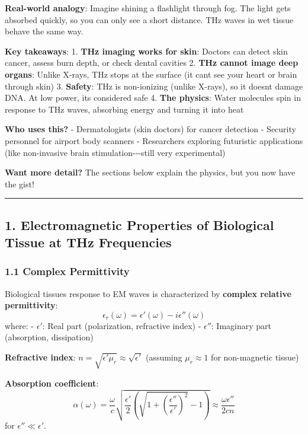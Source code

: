 \textbf{Real-world analogy}: Imagine shining a flashlight through fog.
The light gets absorbed quickly, so you can only see a short distance.
THz waves in wet tissue behave the same way.

\textbf{Key takeaways}: 1. \textbf{THz imaging works for skin}: Doctors
can detect skin cancer, assess burn depth, or check dental cavities 2.
\textbf{THz cannot image deep organs}: Unlike X-rays, THz stops at the
surface (it can\textquotesingle t see your heart or brain through skin)
3. \textbf{Safety}: THz is non-ionizing (unlike X-rays), so it
doesn\textquotesingle t damage DNA. At low power, it\textquotesingle s
considered safe 4. \textbf{The physics}: Water molecules spin in
response to THz waves, absorbing energy and turning it into heat

\textbf{Who uses this?} - Dermatologists (skin doctors) for cancer
detection - Security personnel for airport body scanners - Researchers
exploring futuristic applications (like non-invasive brain
stimulation-\/-\/-still very experimental)

\textbf{Want more detail?} The sections below explain the physics, but
you now have the gist!

\begin{center}\rule{0.5\linewidth}{0.5pt}\end{center}

\subsection{1. Electromagnetic Properties of Biological Tissue at THz
Frequencies}\label{electromagnetic-properties-of-biological-tissue-at-thz-frequencies}

\subsubsection{1.1 Complex Permittivity}\label{complex-permittivity}

Biological tissue\textquotesingle s response to EM waves is
characterized by \textbf{complex relative permittivity}:
\[\epsilon_r(\omega) = \epsilon'(\omega) - i\epsilon''(\omega)\] where:
- \(\epsilon'\): Real part (polarization, refractive index) -
\(\epsilon''\): Imaginary part (absorption, dissipation)

\textbf{Refractive index}:
\(n = \sqrt{\epsilon' \mu_r} \approx \sqrt{\epsilon'}\) (assuming
\(\mu_r \approx 1\) for non-magnetic tissue)

\textbf{Absorption coefficient}:
\[\alpha(\omega) = \frac{\omega}{c} \sqrt{\frac{\epsilon'}{2} \left( \sqrt{1 + \left(\frac{\epsilon''}{\epsilon'}\right)^2} - 1 \right)} \approx \frac{\omega \epsilon''}{2cn}\]
for \(\epsilon'' \ll \epsilon'\).

